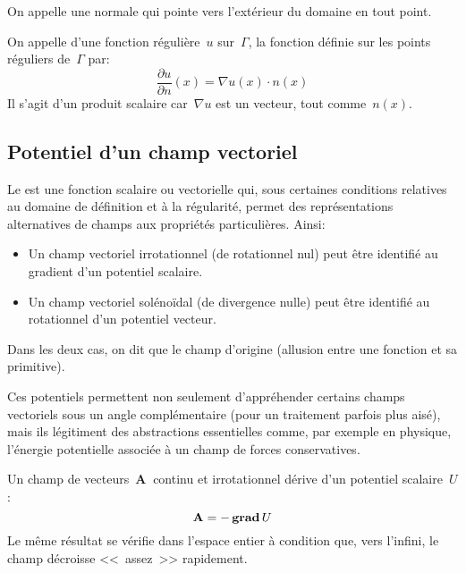 \medskip
On appelle  une normale qui pointe vers
l'extérieur du domaine en tout point.

\medskip
\begin{definition}
On appelle  d'une fonction régulière~$u$
sur~$\Gamma$, la fonction définie sur les points réguliers de~$\Gamma$ par:
\begin{equation}\dfrac{\partial u}{\partial n}(x)=\nabla u(x)\cdot n(x)\end{equation} Il s'agit d'un produit
scalaire car~$\nabla u$ est un vecteur, tout comme~$n(x)$.
\end{definition}

\medskip
\subsection{Potentiel d'un champ vectoriel}

Le  est une fonction scalaire ou vectorielle qui,
sous certaines conditions relatives au domaine de définition et à la régularité,
permet des représentations alternatives de champs aux propriétés particulières.
Ainsi:
\begin{itemize}
  \item Un champ vectoriel irrotationnel (de rotationnel nul) peut être identifié au gradient d'un potentiel scalaire.
  \item Un champ vectoriel solénoïdal (de divergence nulle) peut être identifié au rotationnel d'un potentiel vecteur.
\end{itemize}
Dans les deux cas, on dit que le champ d'origine 
(allusion entre une fonction et sa primitive).

\medskip
Ces potentiels permettent non seulement d'appréhender certains champs vectoriels sous un angle
complémentaire (pour un traitement parfois plus aisé), mais ils légitiment des abstractions essentielles
comme, par exemple en physique, l'énergie potentielle associée à un champ de forces conservatives.

\medskip
Un champ de vecteurs~$\mathbf{A}~$ continu et irrotationnel dérive d'un potentiel scalaire~$U$:
\begin{equation}
 \mathbf{A} = -\operatorname{\mathbf{grad}} U
\end{equation}
Le même résultat se vérifie dans l'espace entier à condition que, vers l'infini, le champ
décroisse <<~assez~>> rapidement.

